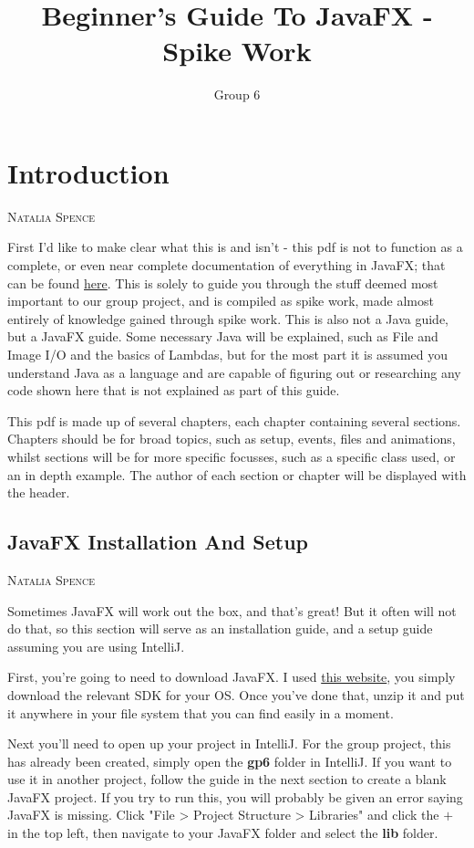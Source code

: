 \documentclass[a4paper]{report}
\title{Beginner's Guide To JavaFX - Spike Work}
\author{Group 6}
\makeatletter
\newcommand{\chapterauthor}[1]{%
	{\parindent0pt\vspace*{-25pt}%
		\linespread{1.1}\large\scshape#1%
		\par\nobreak\vspace*{25pt}}
	\@afterheading%
}
\newcommand{\sectionauthor}[1]{%
	{\parindent0pt\vspace*{0pt}%
		\linespread{1.1}\large\scshape#1%
		\par\nobreak\vspace*{10pt}}
	\@afterheading%
}
\newcommand{\link}[2]{\color{blue}\href{#1}{#2}\color{black}}
\makeatother
\begin{document}
	\maketitle
	\tableofcontents
	\newpage
	
	\chapter{Introduction}\label{chap:introduction}
	\chapterauthor{Natalia Spence}
	
		First I'd like to make clear what this is and isn't - this pdf is not to function as a complete, or even near complete documentation of everything in JavaFX; that can be found \link{https://openjfx.io/javadoc/23/}{here}. This is solely to guide you through the stuff deemed most important to our group project, and is compiled as spike work, made almost entirely of knowledge gained through spike work. This is also not a Java guide, but a JavaFX guide. Some necessary Java will be explained, such as File and Image I/O and the basics of Lambdas, but for the most part it is assumed you understand Java as a language and are capable of figuring out or researching any code shown here that is not explained as part of this guide.
		
		This pdf is made up of several chapters, each chapter containing several sections. Chapters should be for broad topics, such as setup, events, files and animations, whilst sections will be for more specific focusses, such as a specific class used, or an in depth example. The author of each section or chapter will be displayed with the header.
		
		\section{JavaFX Installation And Setup}\label{sec:javafx installation and setup}
		\sectionauthor{Natalia Spence}
		
			Sometimes JavaFX will work out the box, and that's great! But it often will not do that, so this section will serve as an installation guide, and a setup guide assuming you are using IntelliJ.
			
			First, you're going to need to download JavaFX. I used \link{https://gluonhq.com/products/javafx/}{this website}, you simply download the relevant SDK for your OS. Once you've done that, unzip it and put it anywhere in your file system that you can find easily in a moment.
			
			Next you'll need to open up your project in IntelliJ. For the group project, this has already been created, simply open the \textbf{gp6} folder in IntelliJ. If you want to use it in another project, follow the guide in the next section to create a blank JavaFX project. If you try to run this, you will probably be given an error saying JavaFX is missing. Click "File > Project Structure > Libraries" and click the $+$ in the top left, then navigate to your JavaFX folder and select the \textbf{lib} folder.
			
\end{document}
